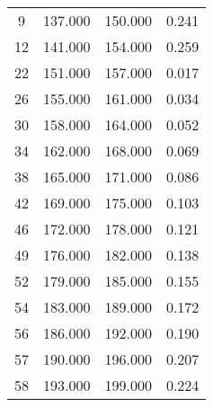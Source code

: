 % 
\begin{tabular}{cccc}
  \hline
  \hline
9 & 137.000 & 150.000 & 0.241 \\ 
  12 & 141.000 & 154.000 & 0.259 \\ 
  22 & 151.000 & 157.000 & 0.017 \\ 
  26 & 155.000 & 161.000 & 0.034 \\ 
  30 & 158.000 & 164.000 & 0.052 \\ 
  34 & 162.000 & 168.000 & 0.069 \\ 
  38 & 165.000 & 171.000 & 0.086 \\ 
  42 & 169.000 & 175.000 & 0.103 \\ 
  46 & 172.000 & 178.000 & 0.121 \\ 
  49 & 176.000 & 182.000 & 0.138 \\ 
  52 & 179.000 & 185.000 & 0.155 \\ 
  54 & 183.000 & 189.000 & 0.172 \\ 
  56 & 186.000 & 192.000 & 0.190 \\ 
  57 & 190.000 & 196.000 & 0.207 \\ 
  58 & 193.000 & 199.000 & 0.224 \\ 
   \hline
\end{tabular}
